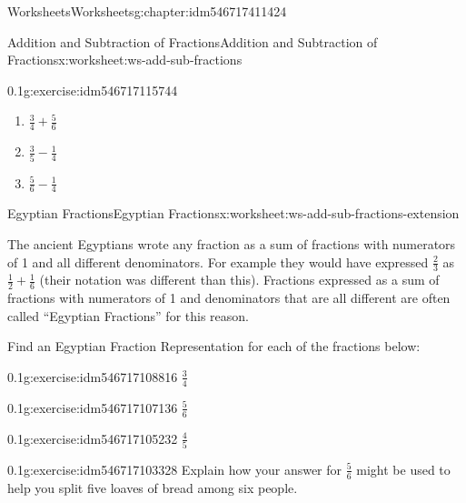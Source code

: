 \documentclass[twoside,11pt,]{book}
\begin{document}
\begin{chapterptx}{Worksheets}{}{Worksheets}{}{}{g:chapter:idm546717411424}
\begin{worksheet-section-numberless}{Addition and Subtraction of Fractions}{}{Addition and Subtraction of Fractions}{}{}{x:worksheet:ws-add-sub-fractions}
\begin{divisionexercise}{3}{}{0.1}{g:exercise:idm546717115744}
\begin{enumerate}[label=(\alph*)]
\item{}\(\frac{3}{4} + \frac{5}{6} \)%
\item{}\(\frac{3}{5} - \frac{1}{4} \)%
\item{}\(\frac{5}{6} - \frac{1}{4} \)%
\end{enumerate}
\end{divisionexercise}%
\end{worksheet-section-numberless}
\restoregeometry
%
%
\typeout{************************************************}
\typeout{************************************************}
%
\begin{worksheet-section-numberless}{Egyptian Fractions}{}{Egyptian Fractions}{}{}{x:worksheet:ws-add-sub-fractions-extension}
\begin{introduction}{}%
The ancient Egyptians wrote any fraction as a sum of fractions with numerators of 1 and all different denominators.  For example they would have expressed \(\frac{2}{3} \) as \(\frac{1}{2} + \frac{1}{6} \) (their notation was different than this).  Fractions expressed as a sum of fractions with numerators of 1 and denominators that are all different are often called “Egyptian Fractions” for this reason.%
\par
Find an Egyptian Fraction Representation for each of the fractions below:%
\end{introduction}%
\begin{divisionexercise}{1}{}{0.1}{g:exercise:idm546717108816}%
\(\frac{3}{4} \)%
\end{divisionexercise}%
\begin{divisionexercise}{2}{}{0.1}{g:exercise:idm546717107136}%
\(\frac{5}{6} \)%
\end{divisionexercise}%
\begin{divisionexercise}{3}{}{0.1}{g:exercise:idm546717105232}%
\(\frac{4}{5} \)%
\end{divisionexercise}%
\begin{divisionexercise}{4}{}{0.1}{g:exercise:idm546717103328}%
Explain how your answer for \(\frac{5}{6} \) might be used to help you split five loaves of bread among six people.%
\end{divisionexercise}%
\end{worksheet-section-numberless}
\restoregeometry
%
%
\typeout{************************************************}
\typeout{************************************************}

\end{chapterptx}
\end{document}

